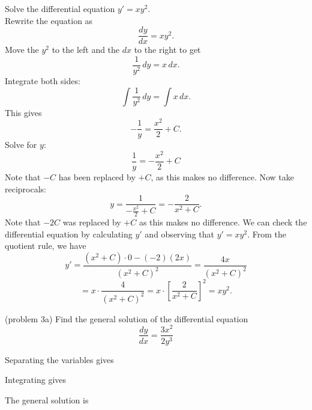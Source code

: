 \documentclass[handout]{ximera}
\begin{document}
\begin{example}[example 3]
Solve the differential equation $y' = xy^2$.\\
Rewrite the equation as 
\[
\frac{dy}{dx} = xy^2.
\]
Move the $y^2$ to the left and the $dx$ to the right to get
\[
\frac{1}{y^2} \, dy = x \,  dx.
\]
Integrate both sides:
\[
\int \frac{1}{y^2}\,  dy  = \int x \, dx.
\]
This gives
\[
-\frac{1}{y} = \frac{x^2}{2} + C.
\]
Solve for $y$:
\[
\frac{1}{y} = -\frac{x^2}{2} + C
\]
Note that $-C$ has been replaced by $+C$, as this makes no difference. Now take reciprocals:
\[
y = \frac{1}{-\frac{x^2}{2} + C} = - \frac{2}{x^2 + C}.
\]
Note that $-2C$ was replaced by $+C$ as this makes no difference.
We can check the differential equation by calculating $y'$ and observing that $y' = xy^2$.
From the quotient rule, we have
\[
y' = \frac{(x^2 + C)\cdot 0 - (-2)(2x)}{(x^2 + C)^2} = \frac{4x}{(x^2 + C)^2} 
\]
\[
= x \cdot \frac{4}{(x^2 + C)^2} = x \cdot \left[\frac{2}{x^2 + C}\right]^2 = xy^2.
\]



\end{example}


\begin{problem}(problem 3a)
Find the general solution of the differential equation
\[
\frac{dy}{dx} = \frac{3x^2}{2y^3}
\]

Separating the variables gives

\begin{multipleChoice}
\end{multipleChoice}

Integrating gives

\begin{multipleChoice}
\end{multipleChoice}

The general solution is

\begin{multipleChoice}
\end{multipleChoice}

\end{problem}
\end{document}
